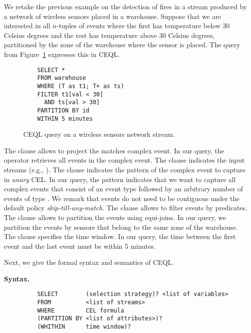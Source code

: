 \begin{example}
We retake the previous example on the detection of fires in a stream produced by a network of wireless sensors placed in a warehouse. Suppose that we are interested in all $n$-tuples of  events where the first has temperature below $30$ Celsius degrees and the rest has temperature above $30$ Celsius degrees, partitioned by the zone of the warehouse where the sensor is placed. The query from Figure~\ref{fig:query:2} expresses this in CEQL.

\begin{figure}[H]
  \begin{verbatim}
    SELECT *
    FROM warehouse
    WHERE (T as t1; T+ as ts)
    FILTER t1[val < 30]
      AND ts[val > 30]
    PARTITION BY id
    WITHIN 5 minutes
  \end{verbatim}
  \caption{CEQL query on a wireless sensors network stream.}
  \label{fig:query:2}
\end{figure}

The  clause allows to project the matches complex event. In our query, the \code{*} operator retrieves all events in the complex event. The  clause indicates the input streams (e.g., ). The  clause indicates the pattern of the complex event to capture in \emph{unary} CEL. In our query, the pattern  indicates that we want to capture all complex events that consist of an event type  followed by an arbitrary number of events of type . We remark that events do not need to be contiguous under the default policy \emph{skip-till-any-match}. The  clause allows to filter events by predicates. The clause  allows to partition the events using equi-joins. In our query, we partition the events by sensors that belong to the same zone of the warehouse. The  clause specifies the time window. In our query, the time between the first event  and the last event  must be within 5 minutes.
\end{example}

\newpage

Next, we give the formal syntax and semantics of CEQL.

\textbf{Syntax.}

\begin{figure}[H]
  \begin{verbatim}
    SELECT        (selection strategy)? <list of variables>
    FROM          <list of streams>
    WHERE         CEL formula
    (PARTITION BY <list of attributes>)?
    (WHITHIN      time window)?
  \end{verbatim}
\end{figure}

